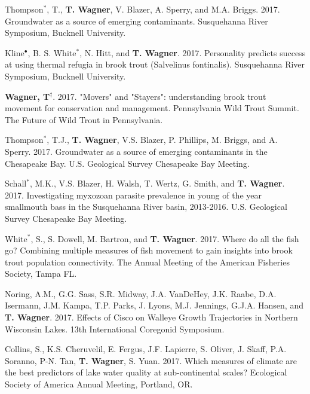 \documentclass[10pt]{article}
\begin{document}
\begin{flushleft}
\begin{etaremune}
\item Thompson$^*$, T., {\bf T. Wagner}, V. Blazer, A. Sperry, and M.A. Briggs. 2017. Groundwater as a source of emerging contaminants. Susquehanna River Symposium, Bucknell University.

\item Kline$^\bullet$, B. S. White$^*$, N. Hitt, and {\bf T. Wagner}. 2017. Personality predicts success at using thermal refugia in brook trout (Salvelinus fontinalis). Susquehanna River Symposium, Bucknell University.

\item {\bf Wagner, T}$^\ddagger$. 2017. "Movers" and "Stayers": understanding brook trout movement for conservation and management. Pennsylvania Wild Trout Summit. The Future of Wild Trout in Pennsylvania.

\item Thompson$^*$, T.J., {\bf T. Wagner}, V.S. Blazer, P. Phillips, M. Briggs, and A. Sperry. 2017. Groundwater as a source of emerging contaminants in the Chesapeake Bay. U.S. Geological Survey Chesapeake Bay Meeting.

\item Schall$^*$, M.K., V.S. Blazer, H. Walsh, T. Wertz, G. Smith, and {\bf T. Wagner}. 2017. Investigating myxozoan parasite prevalence in young of the year smallmouth bass in the Susquehanna River basin, 2013-2016. U.S. Geological Survey Chesapeake Bay Meeting.

\item White$^*$, S., S. Dowell, M. Bartron, and {\bf T. Wagner}. 2017. Where do all the fish go? Combining multiple measures of fish movement to gain insights into brook trout population connectivity. The Annual Meeting of the American Fisheries Society, Tampa FL.

\item Noring, A.M., G.G. Sass, S.R. Midway, J.A. VanDeHey, J.K. Raabe, D.A. Isermann, J.M. Kampa, T.P. Parks, J. Lyons, M.J. Jennings, G.J.A. Hansen, and {\bf T. Wagner}. 2017. Effects of Cisco on Walleye Growth Trajectories in Northern Wisconsin Lakes. 13th International Coregonid Symposium.

\item Collins, S., K.S. Cheruvelil, E. Fergus, J.F. Lapierre, S. Oliver, J. Skaff, P.A. Soranno, P-N. Tan, {\bf T. Wagner}, S. Yuan. 2017. Which measures of climate are the best predictors of lake water quality at sub-continental scales? Ecological Society of America Annual Meeting, Portland, OR. 


\end{etaremune}
\end{flushleft}
\end{document}
